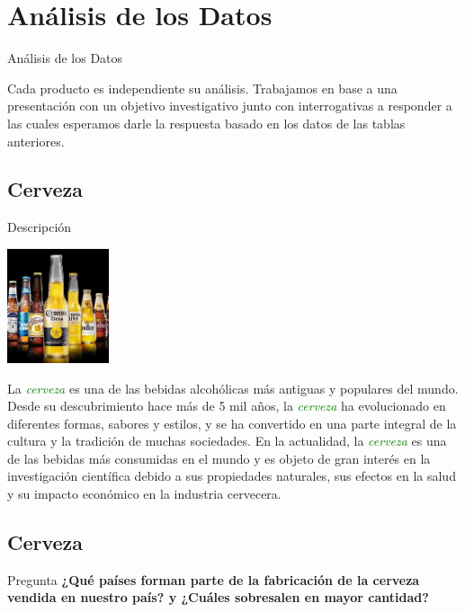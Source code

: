 \section{Análisis de los Datos}
\begin{frame}[fragile]{Análisis de los Datos}
  \begin{center}
    Cada producto es independiente su análisis. Trabajamos en base a una presentación con un objetivo investigativo junto con interrogativas a responder a las cuales esperamos darle la respuesta basado en los datos de las tablas anteriores.
  \end{center}
  
\end{frame}

\subsection{Cerveza}
\begin{frame}[fragile]{Descripción}
  \begin{flushright}
    \includegraphics[width=3cm]{cerveza.jpeg}
    \end{flushright}
    La \textit{\Large\textcolor{green}{cerveza}} es una de las bebidas alcohólicas más antiguas y populares del mundo. 
    Desde su descubrimiento hace más de 5 mil años, la \textit{\Large\textcolor{green}{cerveza}} ha evolucionado en diferentes formas, sabores y estilos, y se ha convertido en una parte integral de la cultura y la tradición de muchas sociedades. 
    En la actualidad, la \textit{\Large\textcolor{green}{cerveza}} es una de las bebidas más consumidas en el mundo y es objeto de gran interés en la investigación científica debido a sus propiedades naturales, sus efectos en la salud y su impacto económico en la industria cervecera. 
\end{frame}

\subsection{Cerveza}
\begin{frame}[fragile]{Pregunta}
  \textbf{\Large¿Qué países forman parte de la fabricación de la cerveza vendida en nuestro país? y ¿Cuáles sobresalen en mayor cantidad?}
\end{frame}

